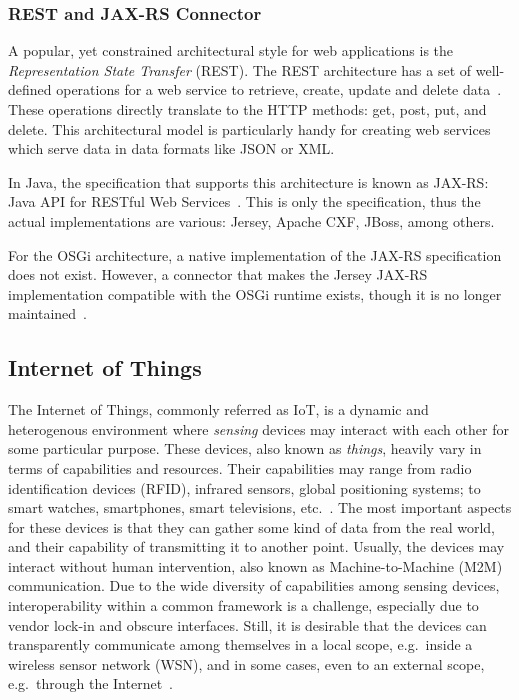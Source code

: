 \documentclass[12pt]{article}
\begin{document}
\subsubsection{REST and JAX-RS Connector}

A popular, yet constrained architectural style for web applications is the \emph{Representation State Transfer} (REST). The REST architecture has a set of well-defined operations for a web service to retrieve, create, update and delete data~\cite{rest_01}. These operations directly translate to the HTTP methods: get, post, put, and delete. This architectural model is particularly handy for creating web services which serve data in data formats like JSON or XML.

In Java, the specification that supports this architecture is known as JAX-RS: Java API for RESTful Web Services~\cite{rest_02}. This is only the specification, thus the actual implementations are various: Jersey, Apache CXF, JBoss, among others.

For the OSGi architecture, a native implementation of the JAX-RS specification does not exist. However, a connector that makes the Jersey JAX-RS implementation compatible with the OSGi runtime exists, though it is no longer maintained~\cite{rest_03}.

\subsection{Internet of Things}
\label{ssec:iot}
The Internet of Things, commonly referred as IoT, is a dynamic and heterogenous environment where \emph{sensing} devices may interact with each other for some particular purpose. These devices, also known as \emph{things}, heavily vary in terms of capabilities and resources. Their capabilities may range from radio identification devices (RFID), infrared sensors, global positioning systems; to smart watches, smartphones, smart televisions, etc.~\cite{ALABA201710}. The most important aspects for these devices is that they can gather some kind of data from the real world, and their capability of transmitting it to another point. Usually, the devices may interact without human intervention, also known as Machine-to-Machine (M2M) communication. Due to the wide diversity of capabilities among sensing devices, interoperability within a common framework is a challenge, especially due to vendor lock-in and obscure interfaces. Still, it is desirable that the devices can transparently communicate among themselves in a local scope, e.g.\ inside a wireless sensor network (WSN), and in some cases, even to an external scope, e.g.\ through the Internet~\cite{Zhang:2015}.
\end{document}
